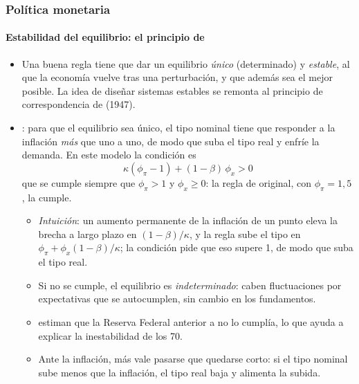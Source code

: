 \documentclass[11pt]{article}
\begin{document}
\subsubsection{Política monetaria}\label{sec:politica-monetaria}

\paragraph{Estabilidad del equilibrio: el principio de }

\begin{itemize}
\item Una buena regla tiene que dar un equilibrio \emph{único} (determinado) y \emph{estable}, al que la economía vuelve tras una perturbación, y que además sea el mejor posible. La idea de diseñar sistemas estables se remonta al principio de correspondencia de  (1947).
\item {}: para que el equilibrio sea único, el tipo nominal tiene que responder a la inflación \emph{más} que uno a uno, de modo que suba el tipo real y enfríe la demanda. En este modelo la condición es
  \begin{equation}
  \kappa(\phi_\pi-1)+(1-\beta)\,\phi_x>0 \label{eq:determinacion}
  \end{equation}
  que se cumple siempre que $\phi_\pi>1$ y $\phi_x\geq0$\nocite{Gali2015Monetary}: la regla de  original, con $\phi_\pi=1{,}5$, la cumple.
  \begin{itemize}
  \item \emph{Intuición}: un aumento permanente de la inflación de un punto eleva la brecha a largo plazo en $(1-\beta)/\kappa$, y la regla sube el tipo en $\phi_\pi+\phi_x(1-\beta)/\kappa$; la condición pide que eso supere 1, de modo que suba el tipo real.
  \item Si no se cumple, el equilibrio es \emph{indeterminado}: caben fluctuaciones por expectativas que se autocumplen, sin cambio en los fundamentos.
  \item \textcite{ClaridaGaliGertler2000Rules} estiman que la Reserva Federal anterior a  no lo cumplía, lo que ayuda a explicar la inestabilidad de los 70.
  \item Ante la inflación, más vale pasarse que quedarse corto: si el tipo nominal sube menos que la inflación, el tipo real baja y alimenta la subida.
  \end{itemize}
\end{itemize}
\end{document}
